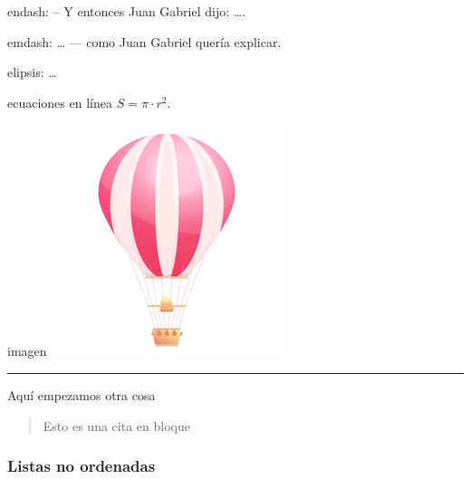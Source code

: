 \documentclass[]{article}
\begin{document}
endash: -- Y entonces Juan Gabriel dijo: \ldots{}.

emdash: \ldots{} --- como Juan Gabriel quería explicar.

elipsis: \ldots{}

ecuaciones en línea \(S = \pi\cdot r^2\).

imagen \includegraphics{../../teoria/Imgs/logo.png}

\begin{center}\rule{0.5\linewidth}{\linethickness}\end{center}

Aquí empezamos otra cosa

\begin{quote}
Esto es una cita en bloque
\end{quote}

\hypertarget{listas-no-ordenadas}{%
\subsubsection{Listas no ordenadas}\label{listas-no-ordenadas}}
\end{document}
